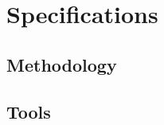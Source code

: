 \chapter{Specifications} %
\label{cha:specifications}

\section{Methodology} %
\label{sec:methodology}


\section{Tools} %
\label{sec:tools}


